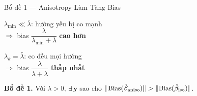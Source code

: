 \documentclass[aspectratio=169,9pt]{beamer}
\begin{document}
\begin{frame}{Bổ đề 1 — Anisotropy Làm Tăng Bias}
\vspace{0.4em}
\begin{center}
\begin{minipage}{0.56\textwidth}
\begin{minipage}[t]{0.49\linewidth}\centering
  {\footnotesize\color{mbad}$\lambda_{\min}\ll\bar\lambda$: hướng yếu bị co mạnh\\[2pt]
   $\Rightarrow$ bias $\dfrac{\lambda}{\lambda_{\min}+\lambda}$ \textbf{cao hơn}}
\end{minipage}\hfill
\begin{minipage}[t]{0.49\linewidth}\centering
  {\footnotesize\color{mgood}$\lambda_k=\bar\lambda$: co đều mọi hướng\\[2pt]
   $\Rightarrow$ bias $\dfrac{\lambda}{\bar\lambda+\lambda}$ \textbf{thấp nhất}}
\end{minipage}
\end{minipage}
\end{center}

\vspace{0.6em}
\begin{center}
\begin{minipage}{0.84\textwidth}
\begin{primarybox}
\footnotesize\textbf{Bổ đề 1.} Với $\lambda>0$, $\exists\,\mathbf{y}$ sao cho
$\|\mathrm{Bias}(\hat\beta_{\rm aniso})\| > \|\mathrm{Bias}(\hat\beta_{\rm iso})\|$.
\end{primarybox}
\end{minipage}
\end{center}

\end{frame}
\end{document}
